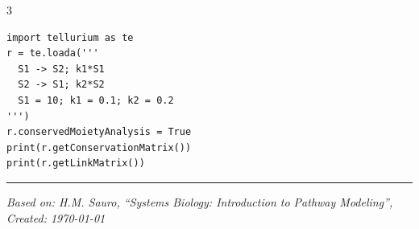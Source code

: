 \documentclass[10pt,landscape,a4paper]{article}
\begin{document}
\begin{multicols}{3}
{\small
\begin{verbatim}
import tellurium as te
r = te.loada('''
  S1 -> S2; k1*S1
  S2 -> S1; k2*S2
  S1 = 10; k1 = 0.1; k2 = 0.2
''')
r.conservedMoietyAnalysis = True
print(r.getConservationMatrix())
print(r.getLinkMatrix())
\end{verbatim}
}

\vfill
\hrule
\vspace{3pt}
\footnotesize
\textit{Based on: H.M. Sauro, ``Systems Biology: Introduction to Pathway Modeling'', Created: \today}

\end{multicols}
\end{document}
